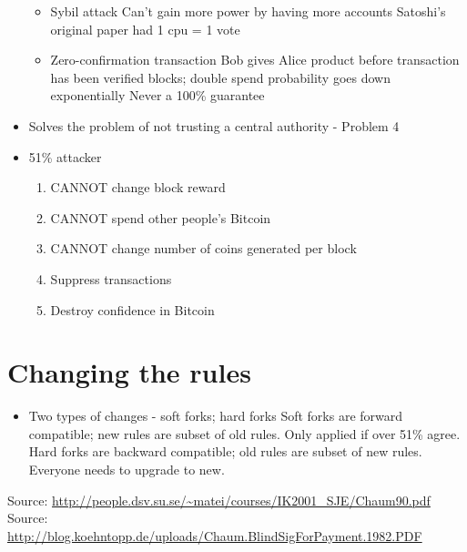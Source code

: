 \documentclass{article}
\begin{document}
\begin{itemize}
\begin{itemize}
      \item Sybil attack
        \subitem Can't gain more power by having more accounts
        \subitem Satoshi's original paper had 1 cpu = 1 vote
      \item Zero-confirmation transaction
        \subitem Bob gives Alice product before transaction has been verified
         blocks; double spend probability goes down exponentially
        \subitem Never a 100\% guarantee
    \end{itemize}
  \item Solves the problem of not trusting a central authority - Problem 4
  \item 51\% attacker
    \begin{enumerate}
      \item CANNOT change block reward
      \item CANNOT spend other people's Bitcoin
      \item CANNOT change number of coins generated per block
      \item Suppress transactions
      \item Destroy confidence in Bitcoin
    \end{enumerate}
\end{itemize}


\section*{Changing the rules}
\begin{itemize}
  \item Two types of changes - soft forks; hard forks
    \subitem Soft forks are forward compatible; new rules are subset of old rules. Only applied if over 51\% agree.
    \subitem Hard forks are backward compatible; old rules are subset of new rules. Everyone needs to upgrade to new.
\end{itemize}



Source: \url{http://people.dsv.su.se/~matei/courses/IK2001_SJE/Chaum90.pdf}\\
Source: \url{http://blog.koehntopp.de/uploads/Chaum.BlindSigForPayment.1982.PDF}
\end{document}
